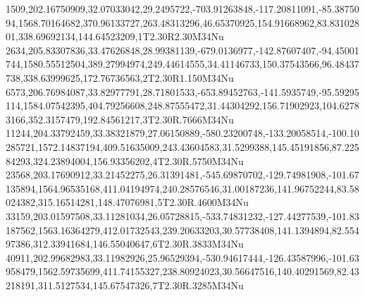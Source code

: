 1509,202.16750909,32.07033042,29.2495722,-703.91263848,-117.20811091,-85.3875094,1568.70164682,370.96133727,263.48313296,46.65370925,154.91668962,83.83102801,338.69692134,144.64523209,1T2.30R2.30M34Nu
2634,205.83307836,33.47626848,28.99381139,-679.0136977,-142.87607407,-94.45001744,1580.55512504,389.27994974,249.44614555,34.41146733,150.37543566,96.48437738,338.63999625,172.76736563,2T2.30R1.150M34Nu
6573,206.76984087,33.82977791,28.71801533,-653.89452763,-141.5935749,-95.59295114,1584.07542395,404.79256608,248.87555472,31.44304292,156.71902923,104.62783166,352.3157479,192.84561217,3T2.30R.7666M34Nu
11244,204.33792459,33.38321879,27.06150889,-580.23200748,-133.20058514,-100.10285721,1572.14837194,409.51635009,243.43604583,31.5299388,145.45191856,87.22584293,324.23894004,156.93356202,4T2.30R.5750M34Nu
23568,203.17690912,33.21452275,26.31391481,-545.69870702,-129.74981908,-101.67135894,1564.96535168,411.04194974,240.28576546,31.00187236,141.96752244,83.58024382,315.16514281,148.47076981,5T2.30R.4600M34Nu
33159,203.01597508,33.11281034,26.05728815,-533.74831232,-127.44277539,-101.83187562,1563.16364279,412.01732543,239.20633203,30.57738408,141.1394894,82.55497386,312.33941684,146.55040647,6T2.30R.3833M34Nu
40911,202.99682983,33.11982926,25.96529394,-530.94617444,-126.43587996,-101.63958479,1562.59735699,411.74155327,238.80924023,30.56647516,140.40291569,82.43218191,311.5127534,145.67547326,7T2.30R.3285M34Nu

